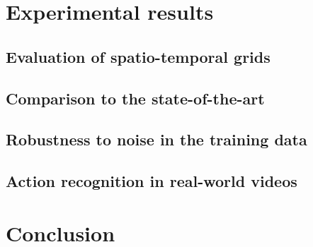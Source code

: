 \documentclass[10pt,twocolumn,letterpaper]{article}
\begin{document}
\section{Experimental results}
\subsection{Evaluation of spatio-temporal grids}
\subsection{Comparison to the state-of-the-art}
\subsection{Robustness to noise in the training data}
\subsection{Action recognition in real-world videos}
\section{Conclusion}
{\small


}
\end{document}
